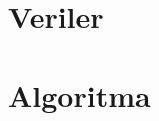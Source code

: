\renewcommand{\appendixname}{}
\renewcommand{\appendixtocname}{EKLER}
\renewcommand{\appendixpagename}{EKLER}

\begin{appendices}
\appendix
\chapter{Veriler}

\chapter{Algoritma}

\end{appendices}
